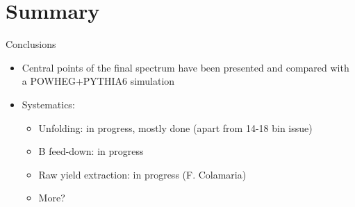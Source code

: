 \documentclass[xcolor={usenames,dvipsnames}]{beamer}
\begin{document}
\section*{Summary}

\begin{frame}{Conclusions}
\begin{itemize}
\item Central points of the final spectrum have been presented and compared with a POWHEG+PYTHIA6 simulation
\item Systematics:
\begin{itemize}
\item Unfolding: in progress, mostly done (apart from 14-18 bin issue)
\item B feed-down: in progress
\item Raw yield extraction: in progress (F. Colamaria)
\item More?
\end{itemize}
\end{itemize}
\end{frame}
\end{document}
